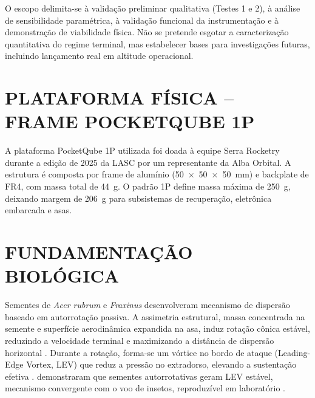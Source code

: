 \documentclass[12pt,fleqn]{article}
\begin{document}
O escopo delimita-se à validação preliminar qualitativa (Testes 1 e 2), à análise de sensibilidade paramétrica, à validação funcional da instrumentação e à demonstração de viabilidade física. Não se pretende esgotar a caracterização quantitativa do regime terminal, mas estabelecer bases para investigações futuras, incluindo lançamento real em altitude operacional.


\section{PLATAFORMA FÍSICA -- FRAME POCKETQUBE 1P}

A plataforma PocketQube 1P utilizada foi doada à equipe Serra Rocketry durante a edição de 2025 da LASC por um representante da Alba Orbital. A estrutura é composta por frame de alumínio (50~$\times$~50~$\times$~50~mm) e backplate de FR4, com massa total de 44~g. O padrão 1P define massa máxima de 250~g, deixando margem de 206~g para subsistemas de recuperação, eletrônica embarcada e asas.


\section{FUNDAMENTAÇÃO BIOLÓGICA}

Sementes de \textit{Acer rubrum} e \textit{Fraxinus} desenvolveram mecanismo de dispersão baseado em autorrotação passiva. A assimetria estrutural, massa concentrada na semente e superfície aerodinâmica expandida na asa, induz rotação cônica estável, reduzindo a velocidade terminal e maximizando a distância de dispersão horizontal \citep{limacher2015, european2009}. Durante a rotação, forma-se um vórtice no bordo de ataque (Leading-Edge Vortex, LEV) que reduz a pressão no extradorso, elevando a sustentação efetiva \citep{lentink2009, mcconnell2023}. \cite{lentink2009} demonstraram que sementes autorrotativas geram LEV estável, mecanismo convergente com o voo de insetos, reproduzível em laboratório \citep{rezgui2020}.

\end{document}
